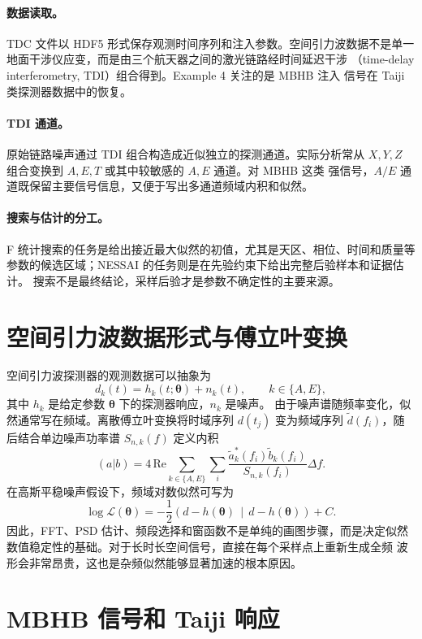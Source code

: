 \documentclass[11pt,a4paper]{ctexart}
\begin{document}
\paragraph{数据读取。}
TDC 文件以 HDF5 形式保存观测时间序列和注入参数。空间引力波数据不是单一
地面干涉仪应变，而是由三个航天器之间的激光链路经时间延迟干涉
（time-delay interferometry, TDI）组合得到。Example 4 关注的是 MBHB 注入
信号在 Taiji 类探测器数据中的恢复。

\paragraph{TDI 通道。}
原始链路噪声通过 TDI 组合构造成近似独立的探测通道。实际分析常从
\(X,Y,Z\) 组合变换到 \(A,E,T\) 或其中较敏感的 \(A,E\) 通道。对 MBHB 这类
强信号，\(A/E\) 通道既保留主要信号信息，又便于写出多通道频域内积和似然。

\paragraph{搜索与估计的分工。}
F 统计搜索的任务是给出接近最大似然的初值，尤其是天区、相位、时间和质量等
参数的候选区域；NESSAI 的任务则是在先验约束下给出完整后验样本和证据估计。
搜索不是最终结论，采样后验才是参数不确定性的主要来源。

\section{空间引力波数据形式与傅立叶变换}

空间引力波探测器的观测数据可以抽象为
\[
  d_k(t) = h_k(t;\bm{\theta}) + n_k(t), \qquad k \in \{A,E\},
\]
其中 \(h_k\) 是给定参数 \(\bm{\theta}\) 下的探测器响应，\(n_k\) 是噪声。
由于噪声谱随频率变化，似然通常写在频域。离散傅立叶变换将时域序列
\(d(t_j)\) 变为频域序列 \(\tilde d(f_i)\)，随后结合单边噪声功率谱
\(S_{n,k}(f)\) 定义内积
\[
  (a|b) =
  4\,\mathrm{Re}\sum_{k\in\{A,E\}}\sum_i
  \frac{\tilde a_k^*(f_i)\tilde b_k(f_i)}{S_{n,k}(f_i)}\Delta f .
\]
在高斯平稳噪声假设下，频域对数似然可写为
\[
  \log \mathcal{L}(\bm{\theta})
  = -\frac{1}{2}\left(d-h(\bm{\theta})\,\middle|\,d-h(\bm{\theta})\right)
  + C .
\]
因此，FFT、PSD 估计、频段选择和窗函数不是单纯的画图步骤，而是决定似然
数值稳定性的基础。对于长时长空间信号，直接在每个采样点上重新生成全频
波形会非常昂贵，这也是杂频似然能够显著加速的根本原因。

\section{MBHB 信号和 Taiji 响应}
\end{document}
